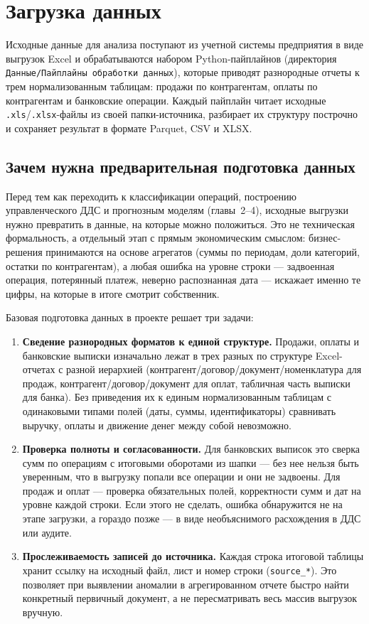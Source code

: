 \chapter{Загрузка данных}
\label{ch:data}

Исходные данные для анализа поступают из учетной системы предприятия в виде выгрузок Excel и обрабатываются набором Python-пайплайнов (директория \texttt{Данные/Пайплайны обработки данных}), которые приводят разнородные отчеты к трем нормализованным таблицам: продажи по контрагентам, оплаты по контрагентам и банковские операции. Каждый пайплайн читает исходные \texttt{.xls}/\texttt{.xlsx}-файлы из своей папки-источника, разбирает их структуру построчно и сохраняет результат в формате Parquet, CSV и XLSX.

\section{Зачем нужна предварительная подготовка данных}

Перед тем как переходить к классификации операций, построению управленческого ДДС и прогнозным моделям (главы~2--4), исходные выгрузки нужно превратить в данные, на которые можно положиться. Это не техническая формальность, а отдельный этап с прямым экономическим смыслом: бизнес-решения принимаются на основе агрегатов (суммы по периодам, доли категорий, остатки по контрагентам), а любая ошибка на уровне строки — задвоенная операция, потерянный платеж, неверно распознанная дата — искажает именно те цифры, на которые в итоге смотрит собственник.

Базовая подготовка данных в проекте решает три задачи:

\begin{enumerate}
  \item \textbf{Сведение разнородных форматов к единой структуре.} Продажи, оплаты и банковские выписки изначально лежат в трех разных по структуре Excel-отчетах с разной иерархией (контрагент/договор/документ/номенклатура для продаж, контрагент/договор/документ для оплат, табличная часть выписки для банка). Без приведения их к единым нормализованным таблицам с одинаковыми типами полей (даты, суммы, идентификаторы) сравнивать выручку, оплаты и движение денег между собой невозможно.
  \item \textbf{Проверка полноты и согласованности.} Для банковских выписок это сверка сумм по операциям с итоговыми оборотами из шапки — без нее нельзя быть уверенным, что в выгрузку попали все операции и они не задвоены. Для продаж и оплат — проверка обязательных полей, корректности сумм и дат на уровне каждой строки. Если этого не сделать, ошибка обнаружится не на этапе загрузки, а гораздо позже — в виде необъяснимого расхождения в ДДС или аудите.
  \item \textbf{Прослеживаемость записей до источника.} Каждая строка итоговой таблицы хранит ссылку на исходный файл, лист и номер строки (\texttt{source\_*}). Это позволяет при выявлении аномалии в агрегированном отчете быстро найти конкретный первичный документ, а не пересматривать весь массив выгрузок вручную.
\end{enumerate}

